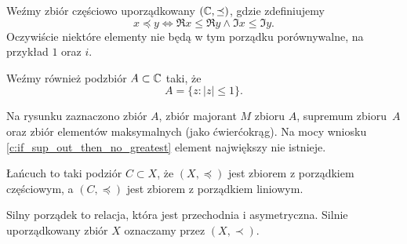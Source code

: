 \documentclass[11pt]{scrartcl}
\begin{document}
    \begin{example}
        Weźmy zbiór częściowo uporządkowany $(\mathbb C, \preceq)$, gdzie zdefiniujemy
        $$ x \preceq y \iff \Re{x} \leq \Re{y} \wedge \Im{x} \leq \Im{y}. $$
        Oczywiście niektóre elementy nie będą w tym porządku porównywalne, na przykład $1$ oraz $i$.

        Weźmy również podzbiór $A \subset \mathbb C$ taki, że
        $$ A = \{z : |z| \leq 1\}. $$

        Na rysunku zaznaczono \textcolor{MainColor1}{zbiór $A$}, \textcolor{LinkColor1}{zbiór majorant $M$ zbioru $A$}, \textcolor{BoxColor1}{supremum zbioru~$A$} oraz \textcolor{MainColor1}{zbiór elementów maksymalnych} (jako ćwierćokrąg). Na mocy wniosku \ref{c:if_sup_out_then_no_greatest} element największy nie istnieje.

        \begin{center}
        \end{center}
    \end{example}

    \begin{definition}
        Łańcuch to taki podziór $C \subset X$, że $(X, \preceq)$ jest zbiorem z porządkiem częściowym, a $(C, \preceq)$ jest zbiorem z porządkiem liniowym.
    \end{definition}

    \begin{definition}
        Silny porządek to relacja, która jest przechodnia i asymetryczna. Silnie uporządkowany zbiór $X$ oznaczamy przez $(X, \prec)$.
    \end{definition}
\end{document}

